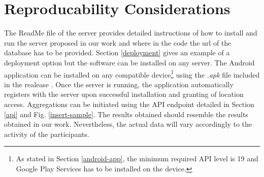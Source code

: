 \section{Reproducability Considerations}
The ReadMe file of the server \parencite{readme-server} provides detailed instructions of how to install and run the server proposed in our work and where in the code the url of the database has to be provided. Section \ref{deployment} gives an example of a deployment option but the software can be installed on any server. The Android application can be installed on any compatible device\footnote{As stated in Section \ref{android-app}, the minimum required API level is 19 and Google Play Services has to be installed on the device.} using the \textit{.apk} file included in the realease \parencite{final-version-app}. Once the server is running, the application automatically registers with the server upon successful installation and granting of location access. Aggregations can be initiated using the API endpoint detailed in Section \ref{api} and Fig. \ref{insert-sample}.
The results obtained should resemble the results obtained in our work. Nevertheless, the actual data will vary accordingly to the activity of the participants.